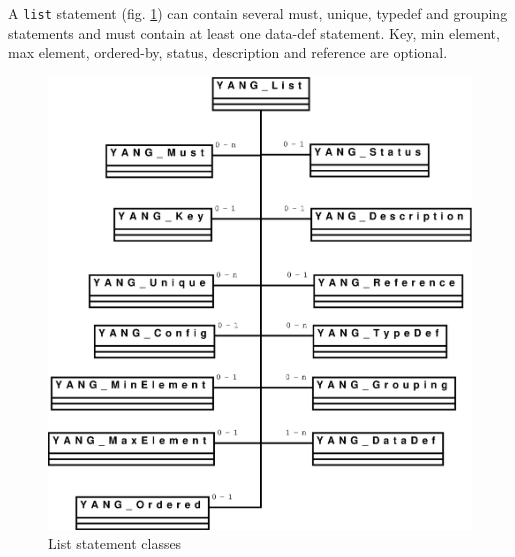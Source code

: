 \documentclass[a4paper]{article}
\begin{document}
A {\tt list} statement (fig. \ref{list}) can contain several must,
unique, typedef and grouping statements and must contain at least one
data-def statement.  Key, min element, max element, ordered-by,
status, description and reference are optional.
\begin{figure}[htbp]
\begin{center}
\includegraphics[scale = .3]{list.eps}
\end{center}
\caption{List statement classes}
\label{list}
\end{figure}
\end{document}
